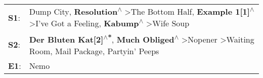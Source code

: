 \begin{supertabular}{p{0.03\textwidth}p{0.92\textwidth}}
 \textbf{S1}:  &  Dump City\textsuperscript{}, \enspace \textbf{Resolution\textsuperscript{$\wedge$}} \textgreater \enspace The Bottom Half\textsuperscript{}, \enspace \textbf{Example 1[1]\textsuperscript{$\wedge$}} \textgreater \enspace I've Got a Feeling\textsuperscript{}, \enspace \textbf{Kabump\textsuperscript{$\wedge$}} \textgreater \enspace Wife Soup\textsuperscript{}  \enspace  \\
 \textbf{S2}:  &                                                                \textbf{Der Bluten Kat[2]\textsuperscript{$\wedge$*}}, \enspace \textbf{Much Obliged\textsuperscript{$\wedge$}} \textgreater \enspace Nopener\textsuperscript{} \textgreater \enspace Waiting Room\textsuperscript{}, \enspace Mail Package\textsuperscript{}, \enspace Partyin' Peeps\textsuperscript{}  \enspace  \\
 \textbf{E1}:  &                                                                                                                                                                                                                                                                                                                                                  Nemo\textsuperscript{}  \enspace  \\
\end{supertabular}
